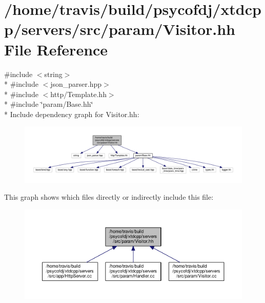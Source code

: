 \hypertarget{Visitor_8hh}{\section{/home/travis/build/psycofdj/xtdcpp/servers/src/param/\-Visitor.hh File Reference}
\label{Visitor_8hh}
}
{\ttfamily \#include $<$string$>$}\\*
{\ttfamily \#include $<$json\-\_\-parser.\-hpp$>$}\\*
{\ttfamily \#include $<$http/\-Template.\-hh$>$}\\*
{\ttfamily \#include \char`\"{}param/\-Base.\-hh\char`\"{}}\\*
Include dependency graph for Visitor.\-hh\-:
\nopagebreak
\begin{figure}[H]
\begin{center}
\leavevmode
\includegraphics[width=350pt]{Visitor_8hh__incl}
\end{center}
\end{figure}
This graph shows which files directly or indirectly include this file\-:
\nopagebreak
\begin{figure}[H]
\begin{center}
\leavevmode
\includegraphics[width=350pt]{Visitor_8hh__dep__incl}
\end{center}
\end{figure}

